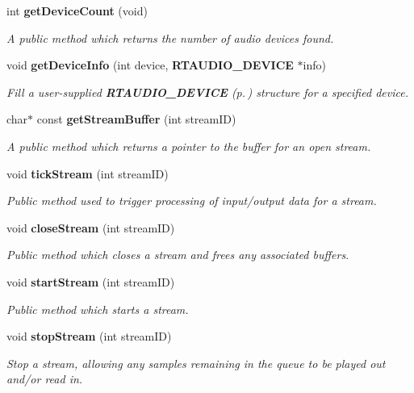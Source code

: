 \begin{CompactItemize}
int {\bf get\-Device\-Count} (void)
\begin{CompactList}\small\item\em A public method which returns the number of audio devices found.\item\end{CompactList}\item 
void {\bf get\-Device\-Info} (int device, {\bf RTAUDIO\_\-DEVICE} $\ast$info)
\begin{CompactList}\small\item\em Fill a user-supplied {\bf RTAUDIO\_\-DEVICE} {\rm (p.\,\pageref{structRtAudio_1_1RTAUDIO__DEVICE})} structure for a specified device.\item\end{CompactList}\item 
char$\ast$ const {\bf get\-Stream\-Buffer} (int stream\-ID)
\begin{CompactList}\small\item\em A public method which returns a pointer to the buffer for an open stream.\item\end{CompactList}\item 
void {\bf tick\-Stream} (int stream\-ID)
\begin{CompactList}\small\item\em Public method used to trigger processing of input/output data for a stream.\item\end{CompactList}\item 
void {\bf close\-Stream} (int stream\-ID)
\begin{CompactList}\small\item\em Public method which closes a stream and frees any associated buffers.\item\end{CompactList}\item 
void {\bf start\-Stream} (int stream\-ID)
\begin{CompactList}\small\item\em Public method which starts a stream.\item\end{CompactList}\item 
void {\bf stop\-Stream} (int stream\-ID)
\begin{CompactList}\small\item\em Stop a stream, allowing any samples remaining in the queue to be played out and/or read in.\item\end{CompactList}\item 

\end{CompactItemize}
